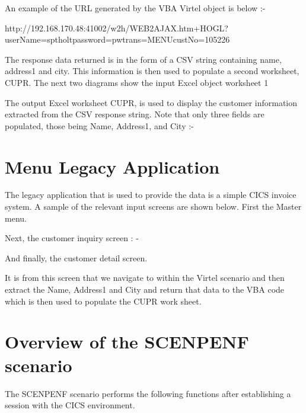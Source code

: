 \documentclass[letterpaper,10pt,english]{sphinxmanual}
\begin{document}
An example of the URL generated by the VBA Virtel object is below :-

\begin{sphinxVerbatim}[commandchars=\\\{\}]
http://192.168.170.48:41002/w2h/WEB2AJAX.htm+HOGL?userName=sptholt\PYGZam{}password=pw\PYGZam{}trans=MENU\PYGZam{}custNo=105226
\end{sphinxVerbatim}

The response data returned is in the form of a CSV string containing name, address1 and city. This information is then used to populate a second worksheet, CUPR. The next two diagrams show the input Excel object worksheet 1


The output Excel worksheet CUPR, is used to display the customer information extracted from the CSV response string. Note that only three fields are populated, those being Name, Address1, and City :-



\chapter{Menu Legacy Application}
\label{\detokenize{TN202001:menu-legacy-application}}
The legacy application that is used to provide the data is a simple CICS invoice system. A sample of the relevant input screens are shown below. First the Master menu.


Next, the customer inquiry screen : -


And finally, the customer detail screen.


It is from this screen that we navigate to within the Virtel scenario and then extract the Name, Address1 and City and return that data to the VBA code which is then used to populate the CUPR work sheet.


\chapter{Overview of the SCENPENF scenario}
\label{\detokenize{TN202001:overview-of-the-scenpenf-scenario}}
The SCENPENF scenario performs the following functions after establishing a session with the CICS environment.
\end{document}
